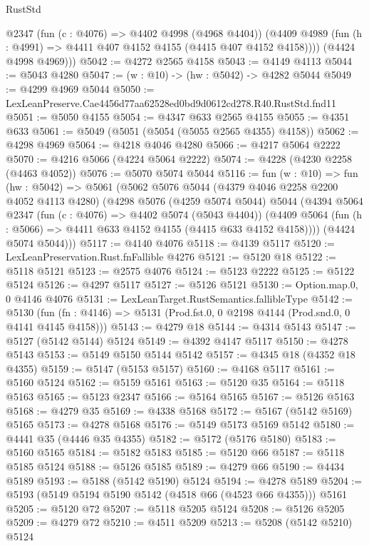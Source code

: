 \begin{lexlean}{RustStd}
\begin{coremodule}
          @2347
          (fun (c : @4076) => @4402 @4998 (@4968 @4404))
          (@4409 @4989 (fun (h : @4991) => @4411 @407 @4152 @4155 (@4415 @407 @4152 @4158))))
        (@4424 @4998 @4969)))
@5042 := @4272 @2565 @4158
@5043 := @4149 @4113
@5044 := @5043 @4280
@5047 := (w : @10) -> (hw : @5042) -> @4282 @5044
@5049 := @4299 @4969 @5044
@5050 := LexLeanPreserve.Cae4456d77aa62528ed0bd9d0612cd278.R40.RustStd.fnd11
@5051 := @5050 @4155
@5054 := @4347 @633 @2565 @4155
@5055 := @4351 @633
@5061 := @5049 (@5051 (@5054 (@5055 @2565 @4355) @4158))
@5062 := @4298 @4969
@5064 := @4218 @4046 @4280
@5066 := @4217 @5064 @2222
@5070 := @4216 @5066 (@4224 @5064 @2222)
@5074 := @4228 (@4230 @2258 (@4463 @4052))
@5076 := @5070 @5074 @5044
@5116 := fun (w : @10) =>
  fun (hw : @5042) =>
  @5061
    (@5062
      @5076
      @5044
      (@4379 @4046 @2258 @2200 @4052 @4113 @4280)
      (@4298
        @5076
        (@4259 @5074 @5044)
        @5044
        (@4394
          @5064
          @2347
          (fun (c : @4076) => @4402 @5074 (@5043 @4404))
          (@4409 @5064 (fun (h : @5066) => @4411 @633 @4152 @4155 (@4415 @633 @4152 @4158))))
        (@4424 @5074 @5044)))
@5117 := @4140 @4076
@5118 := @4139 @5117
@5120 := LexLeanPreservation.Rust.fnFallible @4276
@5121 := @5120 @18
@5122 := @5118 @5121
@5123 := @2575 @4076
@5124 := @5123 @2222
@5125 := @5122 @5124
@5126 := @4297 @5117
@5127 := @5126 @5121
@5130 := Option.map.{0, 0} @4146 @4076
@5131 := LexLeanTarget.RustSemantics.fallibleType
@5142 := @5130
    (fun (fn : @4146) => @5131 (Prod.fst.{0, 0} @2198 @4144 (Prod.snd.{0, 0} @4141 @4145 @4158)))
@5143 := @4279 @18
@5144 := @4314 @5143
@5147 := @5127 (@5142 @5144) @5124
@5149 := @4392 @4147 @5117
@5150 := @4278 @5143
@5153 := @5149 @5150 @5144 @5142
@5157 := @4345 @18 (@4352 @18 @4355)
@5159 := @5147 (@5153 @5157)
@5160 := @4168 @5117
@5161 := @5160 @5124
@5162 := @5159 @5161
@5163 := @5120 @35
@5164 := @5118 @5163
@5165 := @5123 @2347
@5166 := @5164 @5165
@5167 := @5126 @5163
@5168 := @4279 @35
@5169 := @4338 @5168
@5172 := @5167 (@5142 @5169) @5165
@5173 := @4278 @5168
@5176 := @5149 @5173 @5169 @5142
@5180 := @4441 @35 (@4446 @35 @4355)
@5182 := @5172 (@5176 @5180)
@5183 := @5160 @5165
@5184 := @5182 @5183
@5185 := @5120 @66
@5187 := @5118 @5185 @5124
@5188 := @5126 @5185
@5189 := @4279 @66
@5190 := @4434 @5189
@5193 := @5188 (@5142 @5190) @5124
@5194 := @4278 @5189
@5204 := @5193 (@5149 @5194 @5190 @5142 (@4518 @66 (@4523 @66 @4355))) @5161
@5205 := @5120 @72
@5207 := @5118 @5205 @5124
@5208 := @5126 @5205
@5209 := @4279 @72
@5210 := @4511 @5209
@5213 := @5208 (@5142 @5210) @5124

\end{coremodule}
\end{lexlean}
